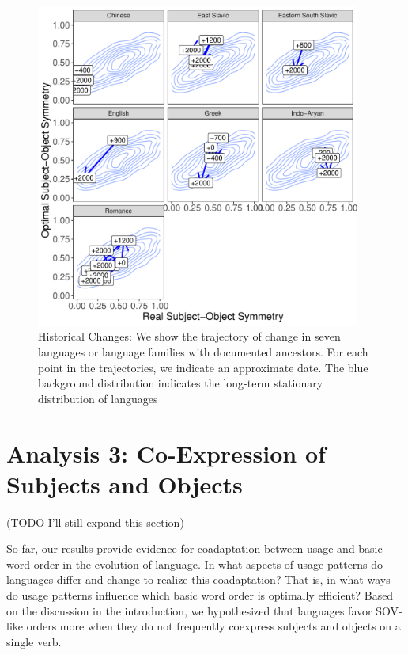 \documentclass[11pt,a4paper]{article}
\newcommand\comment[1]{{\color{red}#1}}
\newcommand\mhahn[1]{{\color{red}(#1)}}
\begin{document}
\begin{figure}
    \centering
    \includegraphics[width=0.95\textwidth]{figures/historical_2.6_times_stationary.pdf}
    \caption{Historical Changes: We show the trajectory of change in seven languages or language families with documented ancestors. For each point in the trajectories, we indicate an approximate date. The blue background distribution indicates the long-term stationary distribution of languages }
    \label{fig:historical}
\end{figure}




\section{Analysis 3: Co-Expression of Subjects and Objects}

\mhahn{TODO I'll still expand this section}

So far, our results provide evidence for coadaptation between usage and basic word order in the evolution of language.
In what aspects of usage patterns do languages differ and change to realize this coadaptation?
That is, in what ways do usage patterns influence which basic word order is optimally efficient?
Based on the discussion in the introduction, we hypothesized that languages favor SOV-like orders more when they do not frequently coexpress subjects and objects on a single verb.
\end{document}
